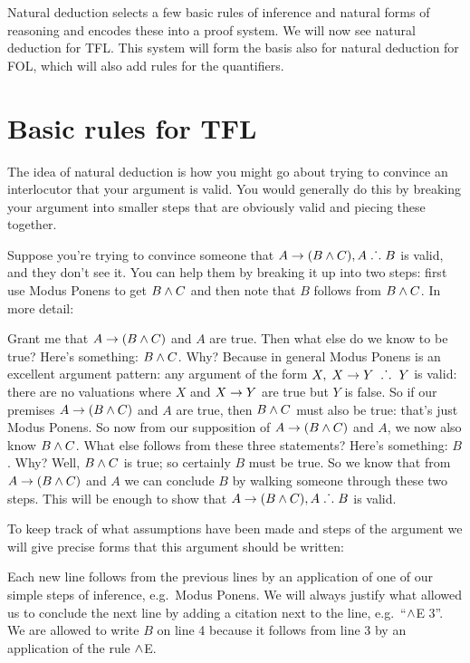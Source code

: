 Natural deduction selects a few basic rules of inference and natural forms of reasoning and encodes these into a proof system. We will now see natural deduction for TFL. This system will form the basis also for natural deduction for FOL, which will also add rules for the quantifiers. 

\chapter{Basic rules for TFL}\label{s:BasicTFL}
The idea of natural deduction is how you might go about trying to convince an interlocutor that your argument is valid. You would generally do this by breaking your argument into smaller steps that are obviously valid and piecing these together. 

Suppose you're trying to convince someone that $A\rightarrow(B\wedge C),A\mathrel{\ldotp\dot{}\,\ldotp} B$ is valid, and they don't see it. You can help them by breaking it up into two steps: first use Modus Ponens to get $B\wedge C$ and then note that $B$ follows from $B\wedge C$. In more detail: 

Grant me that $A\rightarrow (B\wedge C)$ and $A$ are true. Then what else do we know to be true? Here's something: $B\wedge C$. Why? Because in general Modus Ponens is an excellent argument pattern: any argument of the form $X,\;X\rightarrow Y\;\mathrel{\ldotp\dot{}\,\ldotp}\;Y$ is valid: there are no valuations where $X$ and $X\rightarrow Y$ are true but $Y$ is false. So if our premises  $A\rightarrow (B\wedge C)$ and $A$ are true, then $B\wedge C$ must also be true: that's just Modus Ponens. So now from our supposition of $A\rightarrow(B\wedge C)$ and $A$, we now also know $B\wedge C$. What else follows from these three statements? Here's something: $B$. Why? Well, $B\wedge C$ is true; so certainly $B$ must be true. So we know that from $A\rightarrow(B\wedge C)$ and $A$ we can conclude $B$ by walking someone through these two steps. This will be enough to show that $A\rightarrow(B\wedge C),A\mathrel{\ldotp\dot{}\,\ldotp} B$ is valid. 

To keep track of what assumptions have been made and steps of the argument we will give precise forms that this argument should be written:
\begin{pf}
\end{pf}

Each new line follows from the previous lines by an application of one of our simple steps of inference, e.g.~Modus Ponens. We will always justify what allowed us to conclude the next line by adding a citation next to the line, e.g.~``$\wedge$E 3''. We are allowed to write $B$ on line 4 because it follows from line 3 by an application of the rule $\wedge$E. 


